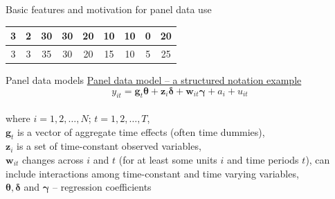 \documentclass[usenames,dvipsnames]{beamer}
\begin{document}
\begin{frame}{Basic features and motivation for panel data use}
\begin{table}[]
{\begin{tabular}{|c|c|c|c|c|c|c|c|c|}
3   & 2    & 30       & 30                                                        & 20                                                     & 10                                                          & 10                                                          & 0                                                          & 20                                                                      \\ \hline
3   & 3    & 35       & 30                                                        & 20                                                     & 15                                                          & 10                                                          & 5                                                          & 25                                                                      \\ \hline
\end{tabular}}
\end{table}
\end{frame}
\begin{frame}{Panel data models}
\underline{Panel data model -- a structured notation example} \\
\medskip
$$y_{it} = \bm{g}_t \bm{\theta} + \bm{z}_i \bm{\delta} + \bm{w}_{it} \bm{\gamma} + a_i + u_{it}$$\\
\medskip
where \quad $i = 1,2, \dots, N$; $t = 1, 2, \dots, T$, \\
\medskip
$\bm{g}_t$ is a vector of aggregate time effects (often time dummies),\\
\medskip
$\bm{z}_i$ is a set of time-constant observed variables, \\
\medskip
$\bm{w}_{it}$ changes across $i$ and $t$ (for at least some units $i$ and time periods $t$), can include interactions among time-constant and time varying variables, \\
\medskip
$\bm{\theta, \delta}$ and $\bm{\gamma}$ -- regression coefficients 
\end{frame}
\end{document}
